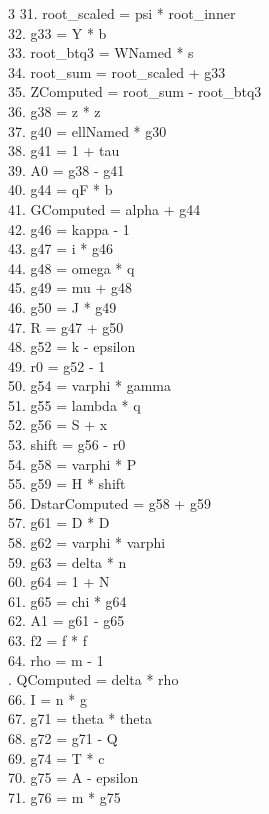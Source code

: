 \documentclass[10pt]{article}
\begin{document}
\begin{multicols}{3}
31. root\_scaled = psi * root\_inner\\
32. g33 = Y * b\\
33. root\_btq3 = WNamed * s\\
34. root\_sum = root\_scaled + g33\\
35. ZComputed = root\_sum - root\_btq3\\
36. g38 = z * z\\
37. g40 = ellNamed * g30\\
38. g41 = 1 + tau\\
39. A0 = g38 - g41\\
40. g44 = qF * b\\
41. GComputed = alpha + g44\\
42. g46 = kappa - 1\\
43. g47 = i * g46\\
44. g48 = omega * q\\
45. g49 = mu + g48\\
46. g50 = J * g49\\
47. R = g47 + g50\\
48. g52 = k - epsilon\\
49. r0 = g52 - 1\\
50. g54 = varphi * gamma\\
51. g55 = lambda * q\\
52. g56 = S + x\\
53. shift = g56 - r0\\
54. g58 = varphi * P\\
55. g59 = H * shift\\
56. DstarComputed = g58 + g59\\
57. g61 = D * D\\
58. g62 = varphi * varphi\\
59. g63 = delta * n\\
60. g64 = 1 + N\\
61. g65 = chi * g64\\
62. A1 = g61 - g65\\
63. f2 = f * f\\
64. rho = m - 1\\
. QComputed = delta * rho\\
66. I = n * g\\
67. g71 = theta * theta\\
68. g72 = g71 - Q\\
69. g74 = T * c\\
70. g75 = A - epsilon\\
71. g76 = m * g75\\

\end{multicols}
\end{document}
